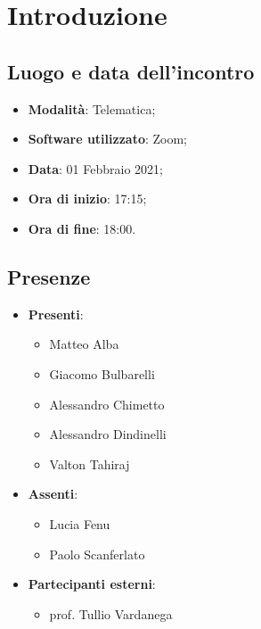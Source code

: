 \documentclass[]{article}
\begin{document}
	
	
	
	\newpage
	
	
	\section{Introduzione}
		\subsection{Luogo e data dell'incontro}
		\begin{itemize}
			\item \textbf{Modalità}: Telematica;
			\item \textbf{Software utilizzato}: Zoom;
			\item \textbf{Data}: 01 Febbraio 2021;
			\item \textbf{Ora di inizio}: 17:15;
			\item \textbf{Ora di fine}: 18:00.
		\end{itemize}
		
		\subsection{Presenze}
		\begin{itemize}
			\item \textbf{Presenti}: 
			\begin{itemize}
				\item Matteo Alba
				\item Giacomo Bulbarelli
				\item Alessandro Chimetto
				\item Alessandro Dindinelli
				\item Valton Tahiraj
			\end{itemize}
			\item \textbf{Assenti}:
			\begin{itemize}
				\item Lucia Fenu
				\item Paolo Scanferlato
			\end{itemize}
			\item \textbf{Partecipanti esterni}:
			\begin{itemize}
				\item prof. Tullio Vardanega
			\end{itemize}	
		\end{itemize}
		
\end{document}
